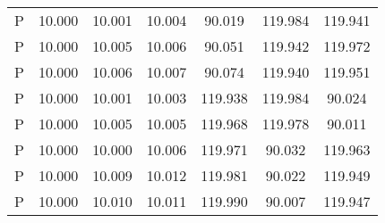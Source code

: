 \documentclass[preprint]{iucr}              %
\begin{document}
{\begin{table}
\begin{tabular}{l c c c c c c}
                P&  10.000&  10.001&  10.004&  90.019&  119.984&  119.941\\
                P&  10.000&  10.005&  10.006&  90.051&  119.942&  119.972\\
                P&  10.000&  10.006&  10.007&  90.074&  119.940&  119.951\\
                P&  10.000&  10.001&  10.003&  119.938&  119.984&  90.024\\
                P&  10.000&  10.005&  10.005&  119.968&  119.978&  90.011\\
                P&  10.000&  10.000&  10.006&  119.971&  90.032&  119.963\\
                P&  10.000&  10.009&  10.012&  119.981&  90.022&  119.949\\
                P&  10.000&  10.010&  10.011&  119.990&  90.007&  119.947\\
\end{tabular}
\end{table}


}
\end{document}
